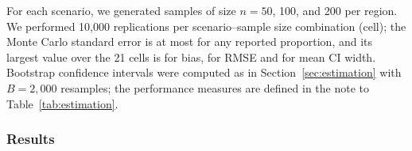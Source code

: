 \documentclass[AMA,Times1COL]{WileyNJDv5}
\begin{document}
For each scenario, we generated samples of size $n = 50$, 100, and 200 per region. %
We performed 10{,}000 replications per scenario--sample size combination (cell); the Monte Carlo standard error is at most  for any reported proportion, and its largest value over the 21 cells is  for bias,  for RMSE and  for mean CI width. Bootstrap confidence intervals were computed as in Section~\ref{sec:estimation} with $B = 2{,}000$ resamples; the performance measures are defined in the note to Table~\ref{tab:estimation}.


\subsubsection{Results}\label{sec:sim_results}
\end{document}
